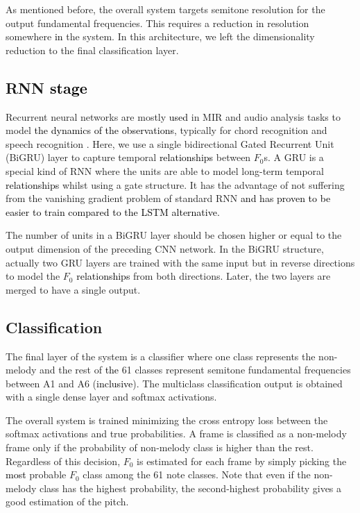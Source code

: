 \documentclass{article}
\newcommand{\gp}[1]{{\textcolor{black}{#1}}}
\newcommand{\gpcor}[2]{{\textcolor{black}{#2}}}
\newcommand{\se}[1]{{\textcolor{black}{#1}}}
\newcommand{\secor}[2]{{\textcolor{black}{#2}}}
\newcommand{\jbcor}[2]{{\textcolor{black}{#2}}}
\begin{document}
As mentioned before, the overall system targets semitone resolution for the output fundamental frequencies. This requires a reduction in resolution somewhere \jbcor{throughout}{in} the system. In this architecture, we left the dimensionality reduction to the final classification layer. 

\subsection{RNN \secor{network}{stage}} \label{subsec:RNNstage}
Recurrent neural networks are mostly \gpcor{utilized}{used} in MIR and audio analysis tasks to model \secor{time series where the samples are correlated}{the dynamics of the observations}, typically for chord recognition \cite{mcfee_chord} and speech recognition \cite{BLSTM_speech}. Here, we use a single bidirectional Gated Recurrent Unit (BiGRU) layer to capture temporal \jbcor{relations}{relationships} between $F_0$s. A GRU is a special kind of RNN \cite{GRU} where the units are able to model long-term temporal \jbcor{relations}{relationships} whilst using a gate structure. It has the advantage of not suffering from the vanishing gradient problem of standard RNN \se{and has proven to be easier to train compared to the 
LSTM alternative.}

The number of units in a BiGRU layer should be chosen higher or equal to the output dimension of the preceding CNN network. In the BiGRU structure, actually two GRU layers are trained with the same input but in reverse directions to model the $F_0$ \jbcor{relations}{relationships} from both directions. Later, the two layers are merged to have a single output.

\subsection{Classification}\label{subsec:Classification}
The final layer of the system is a classifier where one class represents the non-melody and the rest of \gp{the} 61 classes represent semitone fundamental frequencies between A1 and A6 (\jbcor{both being included}{inclusive}). The multiclass classification output is obtained with a single dense layer and softmax activations. 

The overall system is trained minimizing the cross entropy loss between the softmax activations and true probabilities. A frame is classified as a non-melody frame only if the probability of non-melody class is higher than the rest. Regardless of this decision, $F_0$ is estimated for each frame by simply picking the \jbcor{highest}{most} probable $F_0$ class among the 61 note classes. Note that even if the non-melody class has the highest probability, the second-highest probability gives a good estimation of the pitch.   
\end{document}
